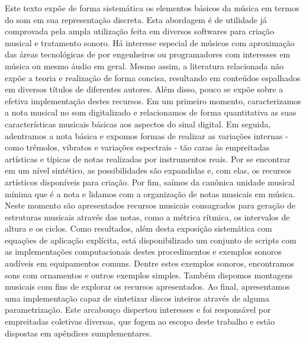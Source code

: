 \begin{resumo}

Este texto expõe de forma sistemática os elementos básicos da música em termos do som em sua representação
discreta. Esta abordagem é de utilidade
já comprovada pela ampla utilização feita em diversos softwares
para criação musical e tratamento sonoro. Há interesse especial
de músicos com aproximação das áreas tecnológicas
de por engenheiros
ou programadores com interesses em música ou mesmo áudio em geral.
Mesmo assim, a literatura relacionada
não expõe a teoria e realização de forma concisa, resultando em conteúdos
espalhados em diversos títulos de diferentes autores. Além disso, pouco se expõe sobre a
efetiva implementação destes recursos. Em um primeiro momento, caracterizamos
a nota musical no som digitalizado e relacionamos de forma quantitativa
as suas características musicais básicas aos aspectos do sinal digital. Em seguida,
adentramos a nota básica e expomos formas de realizar as variações internas - como trêmolos, vibratos e
variações espectrais - tão
caras às empreitadas artísticas e típicas de notas realizadas por instrumentos reais.
Por se encontrar em um nível sintético, as possibilidades são expandidas e, com elas,
os recursos artísticos disponíveis para criação. Por fim, saímos da canônica
unidade musical mínima que é a nota e lidamos com a organização de notas musicais
em música. Neste momento são apresentados recursos musicais consagrados para geração
de estruturas musicais através das notas, como a métrica rítmica, os intervalos de altura e os
ciclos.
Como resultados, além desta exposição sistemática com equações de aplicação explícita,
está disponibilizado um conjunto de scripts
com as implementações computacionais destes procedimentos e exemplos sonoros audíveis em equipamentos
comuns. Dentre estes exemplos sonoros, encontramos sons com ornamentos e outros exemplos simples. Também
dispomos montagens musicais com fins de explorar os recursos apresentados. Ao final, apresentamos
uma implementação capaz de sintetizar discos inteiros através de alguma parametrização.
Este arcabouço dispertou interesses e foi responsável por empreitadas coletivas diversas,
que fogem ao escopo deste trabalho e estão dispostas em apêndices sumplementares.




\end{resumo}
